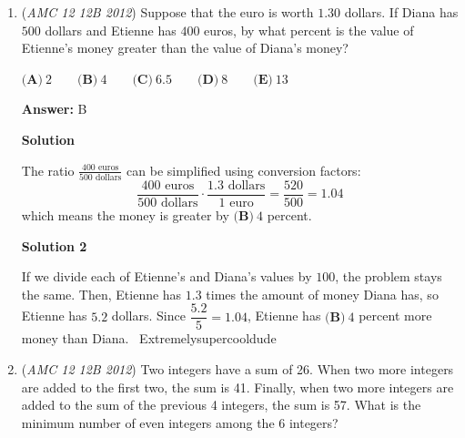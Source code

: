 \begin{enumerate}
 $\textbf{(A)}\ 30\qquad\textbf{(B)}\ 36\qquad\textbf{(C)}\ 42\qquad\textbf{(D)}\ 48\qquad\textbf{(E)}\ 54$

 \textbf{Answer: }D



\textbf{Solution}

If $x$ is the number of holes that the chipmunk dug, then $3x=4(x-4)$, so $3x=4x-16$, and $x=16$. The number of acorns hidden by the chipmunk is equal to $3x = \boxed{\textbf{(D)}\ 48}$




\textbf{Solution 2}

Trying answer choices, we see that $\boxed{\textbf{(D)}\ 48}$ works. ~Extremelysupercooldude

 


	\item (\textit{AMC 12 12B 2012}) Suppose that the euro is worth $1.30$ dollars. If Diana has $500$ dollars and Etienne has $400$ euros, by what percent is the value of Etienne's money greater than the value of Diana's money?


 $\textbf{(A)}\ 2\qquad\textbf{(B)}\ 4\qquad\textbf{(C)}\ 6.5\qquad\textbf{(D)}\ 8\qquad\textbf{(E)}\ 13$

 \textbf{Answer: }B



\textbf{Solution}

The ratio $\frac{400 \text{ euros}}{500 \text{ dollars}}$ can be simplified using conversion factors:
 \[\frac{400 \text{ euros}}{500 \text{ dollars}} \cdot \frac{1.3 \text{ dollars}}{1 \text{ euro}} = \frac{520}{500} = 1.04\] which means the money is greater by $\boxed{ \textbf{(B)} \ 4 }$ percent.

 



\textbf{Solution 2}

If we divide each of Etienne's and Diana's values by $100$, the problem stays the same. Then, Etienne has $1.3$ times the amount of money Diana has, so Etienne has $5.2$ dollars. Since $\dfrac{5.2}{5} = 1.04$, Etienne has $\boxed{ \textbf{(B)} \ 4 }$ percent more money than Diana. ~Extremelysupercooldude

 


	\item (\textit{AMC 12 12B 2012}) Two integers have a sum of 26. When two more integers are added to the first two, the sum is 41. Finally, when two more integers are added to the sum of the previous 4 integers, the sum is 57. What is the minimum number of even integers among the 6 integers? 



\end{enumerate}
